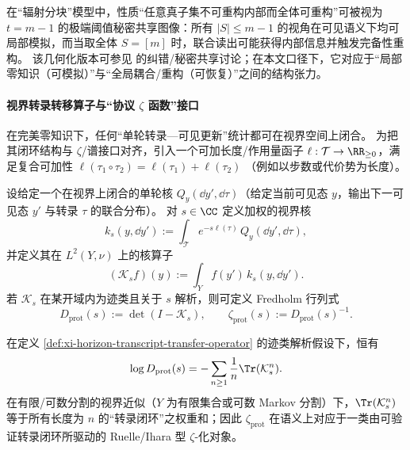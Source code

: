 \begin{remark}\label{rem:xi-threshold-zk-secret-sharing}
在“辐射分块”模型中，性质“任意真子集不可重构内部而全体可重构”可被视为 \(t=m-1\) 的极端阈值秘密共享图像：所有 \(|S|\le m-1\) 的视角在可见语义下均可局部模拟，而当取全体 \(S=[m]\) 时，联合读出可能获得内部信息并触发完备性重构。
该几何化版本可参见 \cite{BalasubramanianEtAl2021SecretSharing} 的纠错/秘密共享讨论；在本文口径下，它对应于“局部零知识（可模拟）”与“全局耦合/重构（可恢复）”之间的结构张力。
\end{remark}

\paragraph{视界转录转移算子与“协议 \texorpdfstring{$\zeta$}{zeta} 函数”接口}
在完美零知识下，任何“单轮转录—可见更新”统计都可在视界空间上闭合。
为把其闭环结构与 \(\zeta\)/谱接口对齐，引入一个可加长度/作用量函子 \(\ell:\mathcal{T}\to\RR_{\ge 0}\)，满足复合可加性
\(
\ell(\tau_1\circ\tau_2)=\ell(\tau_1)+\ell(\tau_2)
\)
（例如以步数或代价势为长度）。

\begin{definition}[视界转录转移算子族与协议行列式]\label{def:xi-horizon-transcript-transfer-operator}
设给定一个在视界上闭合的单轮核 \(Q_y(\dd y',\dd\tau)\)（给定当前可见态 \(y\)，输出下一可见态 \(y'\) 与转录 \(\tau\) 的联合分布）。
对 \(s\in\CC\) 定义加权的视界核
\[
k_s(y,\dd y')
:=
\int_{\mathcal{T}} e^{-s\ell(\tau)}\,Q_y(\dd y',\dd\tau),
\]
并定义其在 \(L^2(Y,\nu)\) 上的核算子
\[
(\mathcal{K}_s f)(y):=\int_Y f(y')\,k_s(y,\dd y').
\]
若 \(\mathcal{K}_s\) 在某开域内为迹类且关于 \(s\) 解析，则可定义 Fredholm 行列式
\[
D_{\mathrm{prot}}(s):=\det(I-\mathcal{K}_s),
\qquad
\zeta_{\mathrm{prot}}(s):=D_{\mathrm{prot}}(s)^{-1}.
\]
\end{definition}

\begin{proposition}[闭环展开恒等式与闭路权重和]\label{prop:xi-horizon-protocol-zeta-loop-expansion}
在定义 \ref{def:xi-horizon-transcript-transfer-operator} 的迹类解析假设下，恒有
\[
\log D_{\mathrm{prot}}(s)=-\sum_{n\ge 1}\frac{1}{n}\Tr(\mathcal{K}_s^{n}).
\]
在有限/可数分割的视界近似（\(Y\) 为有限集合或可数 Markov 分割）下，\(\Tr(\mathcal{K}_s^{n})\) 等于所有长度为 \(n\) 的“转录闭环”之权重和；因此 \(\zeta_{\mathrm{prot}}\) 在语义上对应于一类由可验证转录闭环所驱动的 Ruelle/Ihara 型 \(\zeta\)-化对象。
\end{proposition}

